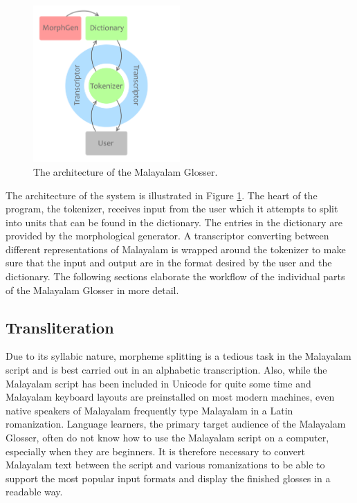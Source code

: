 \documentclass[a4paper]{article}
\begin{document}
\begin{figure}[t]
\centering
\includegraphics[width=0.5\textwidth]{systemarchitecture.png}
\caption{The architecture of the Malayalam Glosser.}
\label{architecture}
\end{figure}

The architecture of the system is illustrated in Figure \ref{architecture}. The heart of the program, the tokenizer, receives input from the user which it attempts to split into units that can be found in the dictionary. The entries in the dictionary are provided by the morphological generator. A transcriptor converting between different representations of Malayalam is wrapped around the tokenizer to make sure that the input and output are in the format desired by the user and the dictionary. The following sections elaborate the workflow of the individual parts of the Malayalam Glosser in more detail.

\subsection{Transliteration}

Due to its syllabic nature, morpheme splitting is a tedious task in the Malayalam script and is best carried out in an alphabetic transcription. Also, while the Malayalam script has been included in Unicode for quite some time and Malayalam keyboard layouts are preinstalled on most modern machines, even native speakers of Malayalam frequently type Malayalam in a Latin romanization. Language learners, the primary target audience of the Malayalam Glosser, often do not know how to use the Malayalam script on a computer, especially when they are beginners. It is therefore necessary to convert Malayalam text between the script and various romanizations to be able to support the most popular input formats and display the finished glosses in a readable way.
\end{document}
